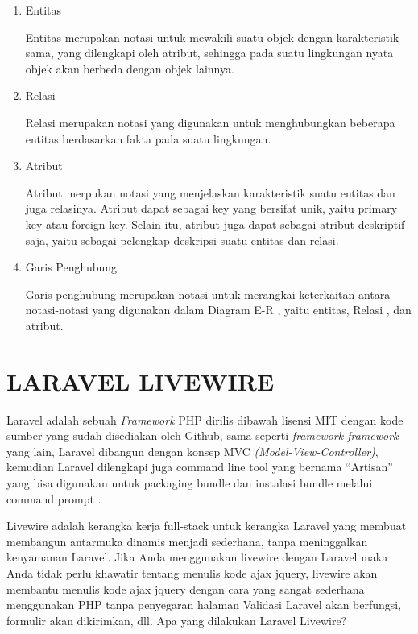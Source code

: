\begin{enumerate}
	\item Entitas
	\par Entitas merupakan notasi untuk mewakili suatu objek dengan karakteristik sama, yang dilengkapi oleh atribut, sehingga pada suatu lingkungan nyata objek akan berbeda dengan objek lainnya.
	\item Relasi
	\par Relasi merupakan notasi yang digunakan untuk menghubungkan beberapa entitas berdasarkan fakta pada suatu lingkungan.
	\item Atribut
	\par Atribut merpukan notasi yang menjelaskan karakteristik suatu entitas dan juga relasinya. Atribut dapat sebagai key yang bersifat unik, yaitu primary key atau foreign key. Selain itu, atribut juga dapat sebagai atribut deskriptif saja, yaitu sebagai pelengkap deskripsi suatu entitas dan relasi.	
	\item Garis Penghubung
	\par Garis penghubung merupakan notasi untuk merangkai keterkaitan antara notasi-notasi yang digunakan dalam Diagram E-R , yaitu entitas, Relasi , dan atribut.
\end{enumerate}

\section{\uppercase{Laravel Livewire}}
\par Laravel adalah sebuah \textit{Framework} PHP dirilis dibawah lisensi MIT dengan kode sumber yang sudah disediakan oleh Github, sama seperti \textit{framework-framework} yang lain, Laravel dibangun dengan konsep MVC \textit{(Model-View-Controller)}, kemudian Laravel dilengkapi juga command line tool yang bernama “Artisan” yang bisa digunakan untuk packaging bundle dan instalasi bundle melalui command prompt \citep{aminudin2015}.

\par Livewire adalah kerangka kerja full-stack untuk kerangka Laravel yang membuat membangun antarmuka dinamis menjadi sederhana, tanpa meninggalkan kenyamanan Laravel. Jika Anda menggunakan livewire dengan Laravel maka Anda tidak perlu khawatir tentang menulis kode ajax jquery, livewire akan membantu menulis kode ajax jquery dengan cara yang sangat sederhana menggunakan PHP tanpa penyegaran halaman Validasi Laravel akan berfungsi, formulir akan dikirimkan, dll. Apa yang dilakukan Laravel Livewire? \citep{krishaweb2021}

